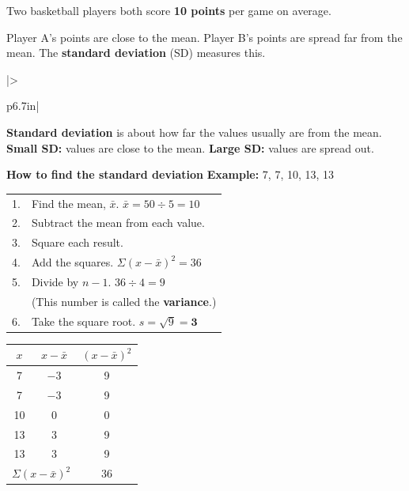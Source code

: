 \documentclass[11pt]{article}
\begin{document}

Two basketball players both score \textbf{10 points} per game on average.

\begin{center}\end{center}

Player A's points are close to the mean. Player B's points are spread far from the mean.
The \textbf{standard deviation} (SD) measures this.

\vspace{0.4em}
\begin{tabular}{|>{\raggedright\arraybackslash}p{6.7in}|}\hline
\textbf{Standard deviation} is about how far the values usually are from the mean.\newline
\textbf{Small SD:} values are close to the mean. \qquad \textbf{Large SD:} values are spread out.\\ \hline
\end{tabular}

\vspace{0.8em}
\textbf{How to find the standard deviation} \hfill \textbf{Example:} 7, 7, 10, 13, 13

\vspace{0.3em}
\begin{minipage}[t]{0.52\linewidth}\vspace{0pt}
\renewcommand{\arraystretch}{1.35}
\begin{tabular}{@{}l@{\;\;}l}
1. & Find the mean, $\bar{x}$. \quad $\bar{x} = 50 \div 5 = 10$\\
2. & Subtract the mean from each value.\\
3. & Square each result.\\
4. & Add the squares. \quad $\Sigma(x - \bar{x})^2 = 36$\\
5. & Divide by $n - 1$. \quad $36 \div 4 = 9$\\
   & (This number is called the \textbf{variance}.)\\
6. & Take the square root. \quad $s = \sqrt{9} = \mathbf{3}$\\
\end{tabular}
\end{minipage}\hfill
\begin{minipage}[t]{0.42\linewidth}\vspace{0pt}\centering
\renewcommand{\arraystretch}{1.3}
\begin{tabular}{|c|c|c|}\hline
$x$ & $x - \bar{x}$ & $(x - \bar{x})^2$ \\ \hline
7 & $-3$ & 9 \\
7 & $-3$ & 9 \\
10 & 0 & 0 \\
13 & 3 & 9 \\
13 & 3 & 9 \\ \hline
\multicolumn{2}{|r|}{$\Sigma(x - \bar{x})^2$} & 36 \\ \hline
\end{tabular}
\end{minipage}
\end{document}
